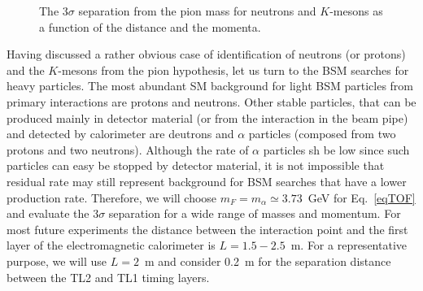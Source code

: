\begin{figure}
\begin{center}
\end{center}
\caption{
The $3\sigma$ separation from the pion mass for neutrons and $K$-mesons as a function of the distance and the momenta.
}
\label{fig:singleparticles}
\end{figure}


Having discussed a rather obvious case of identification of neutrons (or protons) and the $K$-mesons from the pion hypothesis,
let us turn to the BSM searches for heavy particles.
The most abundant SM background for light BSM  particles from primary interactions are protons and neutrons.
Other stable particles, that can be produced mainly in 
detector material (or from the interaction in the beam pipe) 
and detected by calorimeter are deutrons and $\alpha$ particles (composed from two protons and two neutrons). 
Although the rate of $\alpha$ particles sh be low since such particles can easy be stopped by detector material,
it is not impossible that residual rate may still  represent background for BSM searches that have a lower production rate.  
Therefore, we will choose  $m_F=m_{\alpha}\simeq 3.73$~GeV  for Eq.~\ref{eqTOF} and evaluate the
$3\sigma$ separation for a wide range of masses and momentum.
For most future experiments the distance between the 
interaction point and the first layer of the electromagnetic calorimeter is 
$L=1.5-2.5$~m. For a representative purpose, we will use $L=2$~m and consider 0.2~m for the  separation
distance between the TL2 and TL1 timing layers.


